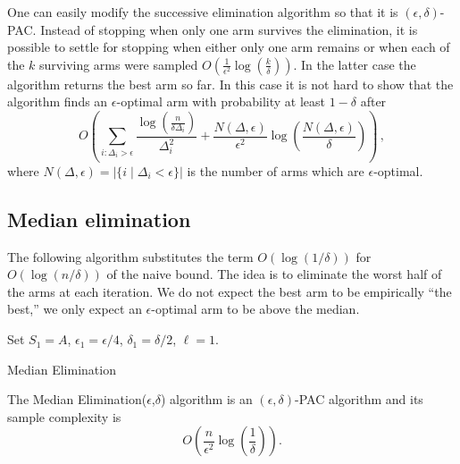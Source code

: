 \begin{remark}
{\rm
\label{rem:epssucc}
One can easily modify the successive
elimination algorithm so that it is $(\epsilon,\delta)$-PAC. Instead
of stopping when only one arm survives the elimination, it is
possible to settle for stopping when either only one arm remains
or when each of the $k$ surviving arms were sampled
$O(\frac{1}{\epsilon ^2} \log(\frac{k}{\delta}))$. In the latter case
the algorithm returns the best arm so far. In this case it is not
hard to show that the algorithm finds an $\epsilon$-optimal arm with
probability at least $1-\delta$ after
$$
O\left(\sum_{i:\Delta_i > \epsilon}
\frac{\log(\frac{n}{\delta\Delta_i})}{\Delta_i^2} +
\frac{N(\Delta, \epsilon)}{\epsilon ^2} \log\left(\frac{N(\Delta, \epsilon)}{\delta}\right)
\right)\,,
$$
where $N(\Delta, \epsilon)= |\{i \;|\; \Delta_i < \epsilon\}|$ is the
number of arms which are $\epsilon $-optimal.
}
\end{remark}


\subsection{Median elimination}
\label{sub:median}

The following algorithm substitutes the term $O(\log (1/\delta))$ for
$O(\log(n/\delta))$ of the naive bound. The idea is
to eliminate the worst half of the arms at each iteration. We do not
expect the best arm to be empirically ``the best,'' we only expect
an $\epsilon$-optimal arm to be above the median.


\begin{algorithm}[H]
 
Set $S_1 = A$, $\epsilon_1 = \epsilon/4$, $\delta_1 = \delta/2$,
$\ell =1$.  \caption{Median Elimination}
\end{algorithm}


\begin{theorem}
\label{the-n-coins} The Median Elimination($\epsilon$,$\delta$)
algorithm is an $(\epsilon,\delta)$-PAC algorithm and
its sample complexity is
$$O\left(\frac{n}{\epsilon^2} \log\left(\frac{1}{\delta}\right)\right).$$
\end{theorem}

